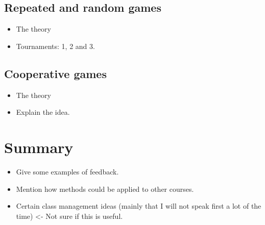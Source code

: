 \documentclass{article}
\begin{document}
\subsection{Repeated and random games}

\begin{itemize}
    \item The theory
    \item Tournaments: 1, 2 and 3.
\end{itemize}

\subsection{Cooperative games}

\begin{itemize}
    \item The theory
    \item Explain the idea.
\end{itemize}

\section{Summary}

\begin{itemize}
    \item Give some examples of feedback.
    \item Mention how methods could be applied to other courses.
    \item Certain class management ideas (mainly that I will not speak first a
        lot of the time) <- Not sure if this is useful.
\end{itemize}

\printbibliography
\end{document}

